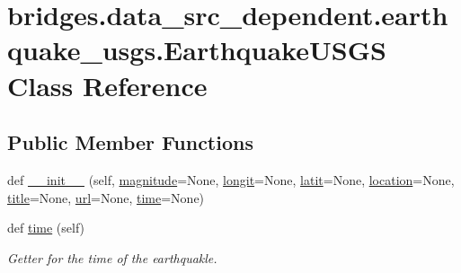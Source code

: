\hypertarget{classbridges_1_1data__src__dependent_1_1earthquake__usgs_1_1_earthquake_u_s_g_s}{}\section{bridges.\+data\+\_\+src\+\_\+dependent.\+earthquake\+\_\+usgs.\+Earthquake\+U\+S\+GS Class Reference}
\label{classbridges_1_1data__src__dependent_1_1earthquake__usgs_1_1_earthquake_u_s_g_s}
\subsection*{Public Member Functions}
\begin{DoxyCompactItemize}
\item 
def \mbox{\hyperlink{classbridges_1_1data__src__dependent_1_1earthquake__usgs_1_1_earthquake_u_s_g_s_abddcbcfdc6985d7b95f3ce780b53b344}{\+\_\+\+\_\+init\+\_\+\+\_\+}} (self, \mbox{\hyperlink{classbridges_1_1data__src__dependent_1_1earthquake__usgs_1_1_earthquake_u_s_g_s_a2ada4ba221f09e4fd249ba53f5647d61}{magnitude}}=None, \mbox{\hyperlink{classbridges_1_1data__src__dependent_1_1earthquake__usgs_1_1_earthquake_u_s_g_s_a98a8f3ee07d05b57c5028b2bad8be9bf}{longit}}=None, \mbox{\hyperlink{classbridges_1_1data__src__dependent_1_1earthquake__usgs_1_1_earthquake_u_s_g_s_ab582eb6b2e8836e10c35f60e14d128d0}{latit}}=None, \mbox{\hyperlink{classbridges_1_1data__src__dependent_1_1earthquake__usgs_1_1_earthquake_u_s_g_s_a3b8f61c92ee3c13d3cd54bc264378882}{location}}=None, \mbox{\hyperlink{classbridges_1_1data__src__dependent_1_1earthquake__usgs_1_1_earthquake_u_s_g_s_a7b46d73e199b4cf4f9b1253f89727abe}{title}}=None, \mbox{\hyperlink{classbridges_1_1data__src__dependent_1_1earthquake__usgs_1_1_earthquake_u_s_g_s_a449a372a14b288f7fd71066fb3886cd1}{url}}=None, \mbox{\hyperlink{classbridges_1_1data__src__dependent_1_1earthquake__usgs_1_1_earthquake_u_s_g_s_aacc317fa18e83353df6c8ffb3d47d6c1}{time}}=None)
\item 
def \mbox{\hyperlink{classbridges_1_1data__src__dependent_1_1earthquake__usgs_1_1_earthquake_u_s_g_s_af978827a241b6906c639194e48ed10df}{time}} (self)
\begin{DoxyCompactList}\small\item\em Getter for the time of the earthquakle. \end{DoxyCompactList}\item 

\end{DoxyCompactItemize}
